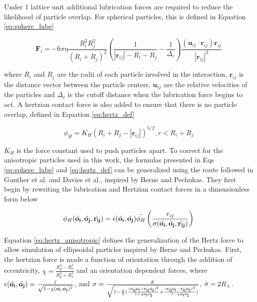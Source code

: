 Under 1 lattice unit additional lubrication forces are required to reduce the likelihood of particle overlap. For 
spherical particles, this is defined in Equation \ref{eq:sphere_lube}

\begin{equation}
    \mathbf{F}_l = -6\pi \eta \frac{R_{i}^{2} R_{j}^{2}}{(R_i + R_j)^2}(\frac{1}{|\mathbf{r}_{ij}| -R_i - R_j} -\frac{1}{\Delta_c}) \frac{(\mathbf{u}_{ij}\cdot\mathbf{r}_{ij})\mathbf{r}_{ij}}{|\mathbf{r}_{ij}|^2}
    \label{eq:sphere_lube}
\end{equation}

where $R_i$ and $R_j$ are the radii of each particle involved in the interaction, $\mathbf{r}_{ij}$ is the distance
 vector between the particle centers, $\mathbf{u}_{ij}$ are the relative velocities of the particles and $\Delta_c$ 
 is the cutoff distance when the lubrication force begins to act. A hertzian contact force is also added to ensure 
 that there is no particle overlap, defined in Equation \ref{eq:hertz_def}

\begin{equation}
    \phi_{H} = K_{H}(R_i + R_j - |\mathbf{r}_{ij}|)^{5/2}, r < R_i + R_j
    \label{eq:hertz_def}
\end{equation}

$K_H$ is the force constant used to push particles apart. To correct for the anisotropic particles used in this work, 
the formulas presented in Eqs \ref{eq:sphere_lube} and \ref{eq:hertz_def} can be generalized using the route followed 
in Gunther et al. and Davies et al., inspired by Berne and Pechukas. \cite{gunther_timescales_2014, davies_interface_2014} 
They first begin by rewriting the lubrication and Hertzian contact forces in a dimensionless form below

\begin{equation}
    \phi_{H}(\hat{\mathbf{o_i}}, \hat{\mathbf{o_j}}, \hat{\mathbf{r_{ij}}}) = \epsilon(\hat{\mathbf{o_i}}, 
    \hat{\mathbf{o_j}})\Bar{\phi_{H}}\left( \frac{r_{ij}}{\sigma(\hat{\mathbf{o_i}}, \hat{\mathbf{o_j}}, 
    \hat{\mathbf{r_{ij}}})} \right)
    \label{eq:hertz_anisotropic}
\end{equation}

Equation \ref{eq:hertz_anisotropic} defines the generalization of the Hertz force to allow simulation of ellipsoidal 
particles inspired by Berne and Pechukas. First, the hertzian force is made a function of orientation through the 
addition of eccentricity, $\chi = \frac{R_p^2 - R_o^2}{R_p^2 + R_o^2}$ and an orientation dependent forces, where 
$\epsilon(\hat{\mathbf{o_i}}, \hat{\mathbf{o_j}}) = \frac{\Bar{\epsilon}}{\sqrt{1 - \chi(\hat{\mathbf{o_i}}, 
\hat{\mathbf{o_j}})^2}}$, and $\sigma = \frac{\Bar{\sigma}}{\sqrt{1 - \frac{\chi}{2}( 
\frac{(\hat{\mathbf{r_{ij}}}\hat{\mathbf{o_i}} +  \hat{\mathbf{r_{ij}}}\hat{\mathbf{o_j}})^2}{1 + 
\chi \hat{\mathbf{o_i}}\hat{\mathbf{o_j}}} +  \frac{(\hat{\mathbf{r_{ij}}}\hat{\mathbf{o_i}} -  
\hat{\mathbf{r_{ij}}}\hat{\mathbf{o_j}})^2}{1 - \chi \hat{\mathbf{o_i}}\hat{\mathbf{o_j}}})}}$, 
$\Bar{\sigma} = 2R_{\perp}$. \cite{gunther_lattice_2013, gunther_timescales_2014, davies_assembling_2014}

